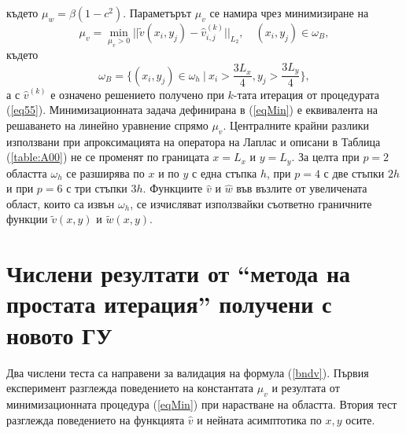 \documentclass{article}
\newcommand{\be}{\begin{equation}}
\newcommand{\ee}{\end{equation}}
\newcommand{\rf}[1]{(\ref{#1})}
\begin{document}
където $\mu_w = \beta(1-c^2)$. Параметърът $\mu_v$ се намира чрез минимизиране на 
\begin{equation}\label{eqMin}
\mu_v = \min_{ \mu_v > 0 } || \tilde v( x_i, y_j) - \widehat v^{(k)}_{i,j} ||_{L_2}, \quad (x_i, y_j) \in \omega_B ,
\end{equation}
където 
\be\label{omegaB}
\omega_B = \{ (x_i, y_j) \in \omega_h \: | \: x_i > \frac{3L_x}{4}, y_j > \frac{3L_y}{4} \},
\ee
а с $\widehat v^{(k)}$ е означено решението получено при $k$-тата итерация от процедурата \rf{eq55}. Минимизационната задача дефинирана в \rf{eqMin} е еквивалента на решаването на линейно уравнение спрямо $\mu_v$. Централните крайни разлики използвани при апроксимацията на оператора на Лаплас и описани в Таблица \rf{table:A00} не се променят по границата $x=L_x$ и $y=L_y$. За целта при $p=2$ областта $\omega_h$ се разширява по $x$ и по $y$ с една стъпка $h$, при $p=4$ с две стъпки $2h$ и при $p=6$ с три стъпки $3h$.
Функциите $\widehat v$ и $\widehat w$ във възлите от увеличената област, които са извън $\omega_h$, се изчисляват използвайки съответно граничните функции $\tilde v(x, y)$ и $\tilde w(x, y)$.

\section{Числени резултати от ``метода на простата итерация'' получени с новото ГУ}
Два числени теста са направени за валидация на формула \rf{bndv}. Първия експеримент разглежда поведението на константата $\mu_v$ и резултата от минимизационната процедура \rf{eqMin} при нарастване на областта. Втория тест разглежда поведението на функцията $\widehat v$ и нейната асимптотика по $x,y$ осите.
\end{document}
